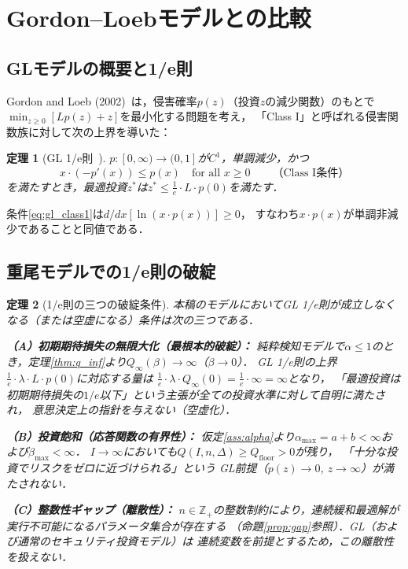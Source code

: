 \documentclass[12pt,a4paper]{article}
\theoremstyle{plain}
\newtheorem{theorem}{定理}[section]
\theoremstyle{definition}
\theoremstyle{remark}
\newcommand{\Z}{\mathbb{Z}}
\newcommand{\Qinf}{Q_{\infty}}
\begin{document}
\section{Gordon--Loebモデルとの比較}
\label{sec:gl}

\subsection{GLモデルの概要と1/e則}

Gordon and Loeb (2002)~\cite{gordon2002}は，侵害確率$p(z)$（投資$z$の減少関数）のもとで
$\min_{z\ge0}[Lp(z)+z]$を最小化する問題を考え，
「Class I」と呼ばれる侵害関数族に対して次の上界を導いた：

\begin{theorem}[GL 1/e則~\cite{gordon2002}]\label{thm:gl_original}
$p:[0,\infty)\to(0,1]$が$C^1$，単調減少，かつ
\begin{equation}\label{eq:gl_class1}
  x\cdot(-p'(x))\le p(x)\quad\text{for all }x\ge0
  \qquad\text{（Class I条件）}
\end{equation}
を満たすとき，最適投資$z^*$は$z^*\le\frac{1}{e}\cdot L\cdot p(0)$を満たす．
\end{theorem}

条件\eqref{eq:gl_class1}は$d/dx[\ln(x\cdot p(x))]\ge0$，
すなわち$x\cdot p(x)$が単調非減少であることと同値である．

\subsection{重尾モデルでの1/e則の破綻}

\begin{theorem}[1/e則の三つの破綻条件]\label{thm:gl}
本稿のモデルにおいてGL 1/e則が成立しなくなる（または空虚になる）条件は次の三つである．

\noindent\textbf{（A）初期期待損失の無限大化（最根本的破綻）：}
純粋検知モデルで$\alpha\le1$のとき，定理\ref{thm:q_inf}より$\Qinf(\beta)\to\infty$（$\beta\to0$）．
GL 1/e則の上界$\frac{1}{e}\cdot\lambda\cdot L\cdot p(0)$に対応する量は
$\frac{1}{e}\cdot\lambda\cdot\Qinf(0)=\frac{1}{e}\cdot\infty=\infty$となり，
「最適投資は初期期待損失の$1/e$以下」という主張が\emph{全ての}投資水準に対して自明に満たされ，
意思決定上の指針を与えない（空虚化）．

\noindent\textbf{（B）投資飽和（応答関数の有界性）：}
仮定\ref{ass:alpha}より$\alpha_{\max}=a+b<\infty$および$\beta_{\max}<\infty$．
$I\to\infty$においても$Q(I,n,\Delta)\ge Q_{\mathrm{floor}}>0$が残り，
「十分な投資でリスクをゼロに近づけられる」という
GL前提（$p(z)\to0$, $z\to\infty$）が満たされない．

\noindent\textbf{（C）整数性ギャップ（離散性）：}
$n\in\Z_+$の整数制約により，連続緩和最適解が実行不可能になるパラメータ集合が存在する
（命題\ref{prop:gap}参照）．GL（および通常のセキュリティ投資モデル）は
連続変数を前提とするため，この離散性を扱えない．
\end{theorem}
\end{document}
